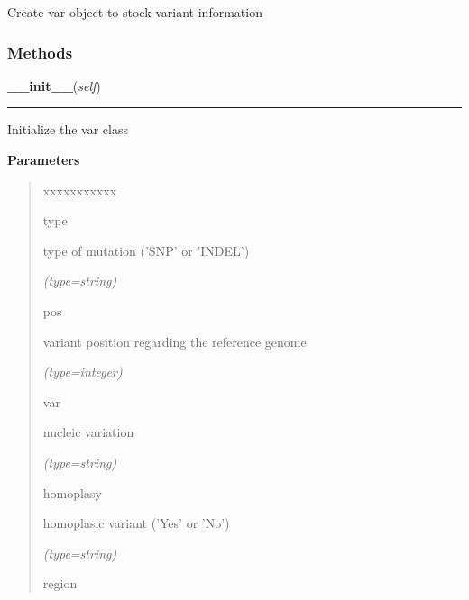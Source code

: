 Create var object to stock variant information



  \subsubsection{Methods}

    \vspace{0.5ex}

\hspace{.8\funcindent}\begin{boxedminipage}{\funcwidth}

    \raggedright \textbf{\_\_init\_\_}(\textit{self})

    \vspace{-1.5ex}

    \rule{\textwidth}{0.5\fboxrule}
\setlength{\parskip}{2ex}
    Initialize the var class

\setlength{\parskip}{1ex}
      \textbf{Parameters}
      \vspace{-1ex}

      \begin{quote}
        \begin{Ventry}{xxxxxxxxxxx}

          \item[type]

          type of mutation ('SNP' or 'INDEL')

            {\it (type=string)}

          \item[pos]

          variant position regarding the reference genome

            {\it (type=integer)}

          \item[var]

          nucleic variation

            {\it (type=string)}

          \item[homoplasy]

          homoplasic variant ('Yes' or 'No')

            {\it (type=string)}

          \item[region]


\end{Ventry}
\end{quote}
\end{boxedminipage}
